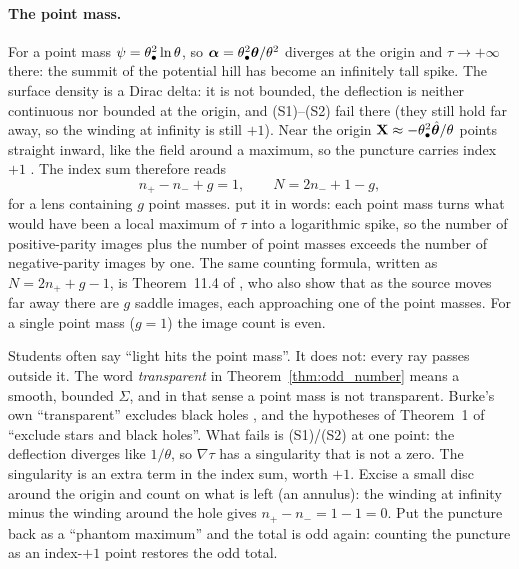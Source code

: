 \paragraph{The point mass.}
For a point mass $\psi=\theta_{\bullet}^2\ln\theta$, so
$\boldsymbol{\alpha}=\theta_{\bullet}^2\boldsymbol{\theta}/\theta^2$ diverges at the origin and
$\tau\to+\infty$ there: the summit of the potential hill has become an
infinitely tall spike.  The surface density is a Dirac delta: it is
not bounded, the deflection is neither continuous nor bounded at
the origin, and (S1)--(S2) fail there (they still hold far away, so the
winding at infinity is still $+1$).  Near the origin
$\mathbf X\approx-\theta_{\bullet}^2\hat{\boldsymbol{\theta}}/\theta$ points straight
inward, like the field around a maximum, so the puncture carries index
$+1$ .  The index sum therefore reads
\begin{equation}
    n_+ - n_- + g = 1, \qquad
    N = 2n_- + 1 - g ,
    \label{eq:oi_index_pm}
\end{equation}
for a lens containing $g$ point masses.
\citet[][Sect.~5.4.1]{schneider_ehlers_falco_1992} put it in words:
each point mass turns what would have been a local maximum of $\tau$
into a logarithmic spike, so the number of positive-parity images
plus the number of point masses exceeds the number of
negative-parity images by one.  The same counting formula, written as
$N=2n_++g-1$, is Theorem~11.4 of \citet{petters_singularity_2001}, who
also show that as the source moves far away there are $g$ saddle
images, each approaching one of the point masses.  For a single point
mass ($g=1$) the image count is even.

\begin{annotation}
Students often say ``light hits the point mass''.  It does not: every
ray passes outside it.  The word \emph{transparent} in
Theorem~\ref{thm:odd_number} means a smooth, bounded $\Sigma$, and in
that sense a point mass is not transparent.  Burke's own
``transparent'' excludes black holes \citep{burke_1981}, and the
hypotheses of Theorem~1 of
\citet[Sect.~5.4.1]{schneider_ehlers_falco_1992} ``exclude stars and
black holes''.  What fails is
(S1)/(S2) at one point: the deflection
diverges like $1/\theta$, so $\nabla\tau$ has a singularity that is
not a zero.  The singularity is an extra term in the index
sum, worth $+1$.  Excise a small disc around the origin and count on
what is left (an annulus): the winding at infinity minus the winding
around the hole gives $n_+-n_-=1-1=0$.  Put the puncture back as a
``phantom maximum'' and the total is odd again: counting the puncture
as an index-$+1$ point restores the odd total.
\end{annotation}

